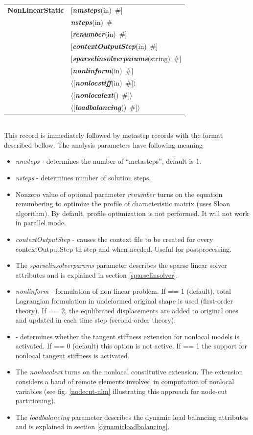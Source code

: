 \documentclass[a4paper]{article}
\makeatletter
\newcommand{\param}[1]{{\em #1}}
\newcommand{\keywordnotype}[1]{\mbox{{\it{\bf{#1}}}}}
\newcommand{\keyword}[2]{\mbox{{\keywordnotype{#1}\tiny (#2)}}}
\newcommand{\entKeywordInst}[1]{\mbox{{\bf{{#1}}}}}
\newcommand{\field}[2]{\mbox{\keyword{#1}{#2}~\#}}
\newcommand{\optField}[2]{\mbox{[\field{#1}{#2}]}}
\newcommand{\Pmode}[1]{{\sffamily #1}}
\newcommand{\PoptField}[2]{\mbox{$\langle$[\field{#1}{#2}]$\rangle$}}
\newenvironment{record}[1][]{\begin{tabular}{|ll}}{\end{tabular}\\}
\newcommand{\recentry}[2]{{#1}&{#2}\\}
\newcounter{rcc}
\newenvironment{record}[1][\textwidth]{\setcounter{rcc}{0}\begin{tabular*}{#1}{|ll@{\extracolsep{\fill}}r}}{\end{tabular*}\\}
\newcommand{\recentry}[2]{\ifthenelse{\value{rcc}>0}{&$\backslash$ \\}{\setcounter{rcc}{1}}{#1}&{#2}}
\makeatother
\begin{document}
\noindent
\begin{record}
\recentry{\entKeywordInst{NonLinearStatic}}{\optField{nmsteps}{in}}
\recentry{}{\field{nsteps}{in}}
\recentry{}{\optField{renumber}{in}}
\recentry{}{\optField{contextOutputStep}{in}}
\recentry{}{\optField{sparselinsolverparams}{string}}
\recentry{}{\optField{nonlinform}{in}}
\recentry{}{\PoptField{nonlocstiff}{in}} \recentry{}{\PoptField{nonlocalext}{}} \recentry{}{\PoptField{loadbalancing}{}}
\end{record}
This record is immediately followed by metastep records with the format described bellow.
The analysis parameters have following meaning
\begin{itemize}
\item \param{nmsteps} - determines the number of
``metasteps'', default is 1.
\item \param{nsteps} - determines number of solution steps.
\item Nonzero value of optional parameter \param{renumber} turns on the
equation renumbering to optimize the profile of characteristic matrix
(uses Sloan algorithm). By default, profile optimization is not
performed. It will not work in parallel mode.
\item \param{contextOutputStep} - causes the context file to be
created for every con\-text\-Out\-put\-Step-th step and when needed. Useful for
postprocessing.
\item The  \param{sparselinsolverparams} parameter describes the sparse
linear solver attributes and is explained in section \ref{sparselinsolver}.
\item \param{nonlinform} - formulation of non-linear problem. If == 1 (default), total Lagrangian formulation in undeformed original shape is used (first-order theory). If == 2, the equlibrated displacements are added to original ones and updated in each time step (second-order theory).
\item \Pmode{\param{nonlocstiff} - determines whether the tangent stiffness
extension for nonlocal models is activated. If == 0 (default) this
option is not active. If == 1 the support for nonlocal tangent
stiffness is activated.}
\item \Pmode{The \param{nonlocalext} turns on the nonlocal constitutive
extension. The extension considers a band of remote elements involved
in computation of nonlocal variables (see fig. \ref{nodecut-nlm} illustrating
this approach for node-cut partitioning)}.
\item \Pmode{The  \param{loadbalancing} parameter describes the dynamic load balancing
attributes and is explained in section \ref{dynamicloadbalancing}}.
\end{itemize}
\end{document}
